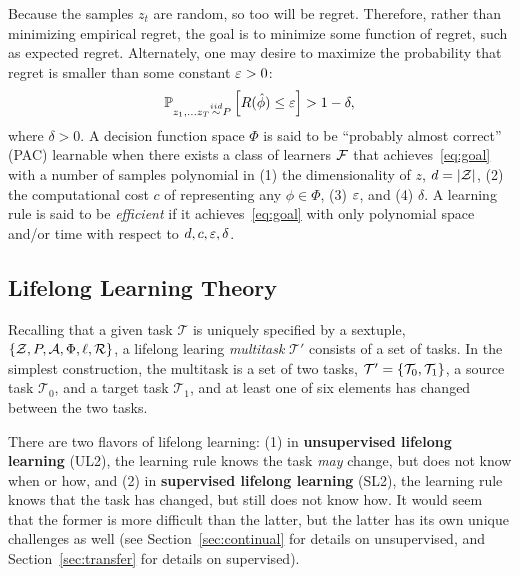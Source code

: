 \documentclass{article}
\begin{document}
Because the samples $z_t$ are random, so too will be regret.  Therefore, rather than minimizing empirical regret, the goal is to minimize some function of regret, such as expected regret. 
% 
Alternately, one may desire to maximize the probability that  regret is smaller than some constant $\varepsilon>0$:
\begin{align} \label{eq:goal}
    \mathbb{P}_{ z_1,\ldots z_T \overset{iid}{\sim} P} \left[R(\hat{\phi})  \leq \varepsilon \right] > 1 - \delta,
\end{align}
where $\delta>0$. A decision function space $\Phi$ is said to be ``probably almost correct'' (PAC) learnable when there exists a class of learners $\mathcal{F}$ that achieves~\eqref{eq:goal} with a  number of samples polynomial in (1) the dimensionality of $z$, $d=|\mathcal{Z}|$, (2) the computational cost $c$ of representing any $\phi \in \Phi$, (3) $\varepsilon$, and  (4) $\delta$.  A learning rule is said to be \emph{efficient} if it achieves~\eqref{eq:goal} with only polynomial space and/or time with respect to $d,c,\varepsilon,\delta$.  

\subsection{Lifelong Learning Theory}

Recalling that a given task $\mathcal{T}$ is uniquely specified by a sextuple, $\{\mathcal{Z}, P, \mathcal{A}, \Phi, \ell, \mathcal{R}\}$, a lifelong learing \emph{multitask} $\mathcal{T}'$ consists of a set of tasks.  In the simplest construction, the multitask is a set of two tasks, $\mathcal{T}'=\{\mathcal{T}_0, \mathcal{T}_1\}$,  a source task $\mathcal{T}_0$, and a target task $\mathcal{T}_1$, and at least one of six elements has changed between the two tasks.  


There are two flavors of lifelong learning: (1) in \textbf{unsupervised lifelong learning} (UL2), the learning rule knows the task \emph{may} change, but does not know when or how, and (2) in \textbf{supervised lifelong learning} (SL2), the learning rule knows that the task has changed, but still does not know how.  It would seem that the former is more difficult than the latter, but the latter has its own unique challenges as well (see Section~\ref{sec:continual} for details on unsupervised, and Section~\ref{sec:transfer} for details on supervised).  
\end{document}
